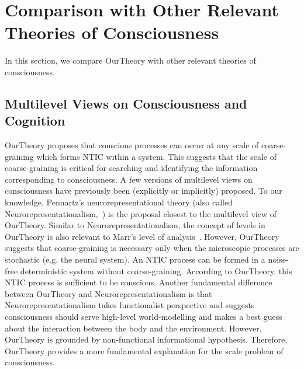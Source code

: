 \documentclass[utf8]{article}
\begin{document}
    \section{Comparison with Other Relevant Theories of Consciousness}\label{sec:Comparison with other theories}
    In this section, we compare \ac{OurTheory} with other relevant theories of consciousness.
	
	
        \subsection{Multilevel Views on Consciousness and Cognition}\label{sec:MultiLevelView}
    		\ac{OurTheory} proposes that conscious processes can occur at any scale of coarse-graining which forms NTIC within a system. This suggests that the scale of coarse-graining is critical for searching and identifying the information corresponding to consciousness. A few versions of multilevel views on consciousness have previously been (explicitly or implicitly) proposed. To our knowledge, Pennartz's neurorepresentational theory (also called Neurorepresentationalism,~\citep{pennartz2018consciousness,pennartz2015brain}) is the proposal closest to the multilevel view of \ac{OurTheory}. Similar to Neurorepresentationalism, the concept of levels in \ac{OurTheory} is also relevant to Marr's level of analysis~\citep{marr1982vision, pennartz2015brain, pennartz2018consciousness}. 
    		However, \ac{OurTheory} suggests that coarse-graining is necessary only when the microscopic processes are stochastic (e.g. the neural system). An NTIC process can be formed in a noise-free deterministic system without coarse-graining. According to \ac{OurTheory}, this NTIC process is sufficient to be conscious. 
    		Another fundamental difference between \ac{OurTheory} and Neurorepresentationalism is that Neurorepresentationalism takes functionalist perspective and suggests consciousness should serve high-level world-modelling and makes a best guess about the interaction between the body and the environment. 
    		However, \ac{OurTheory} is grounded by non-functional informational hypothesis. Therefore, \ac{OurTheory} provides a more fundamental explanation for the scale problem of consciousness. 
    		
\end{document}
